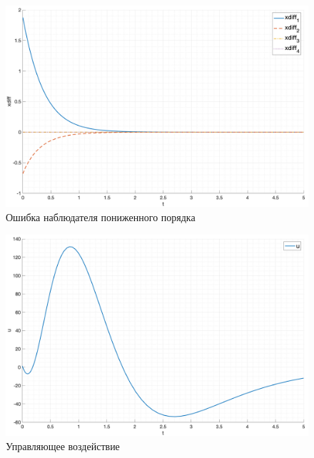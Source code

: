 \begin{figure}
    \centering
    \includegraphics[width=\textwidth]{media/plots/task4_xdiff_1.png}
    \caption{Ошибка наблюдателя пониженного порядка}
    \label{fig:task4_diff_1}
\end{figure}

\begin{figure}
    \centering
    \includegraphics[width=\textwidth]{media/plots/task4_u_1.png}
    \caption{Управляющее воздействие}
    \label{fig:task4_u_1}
\end{figure}

